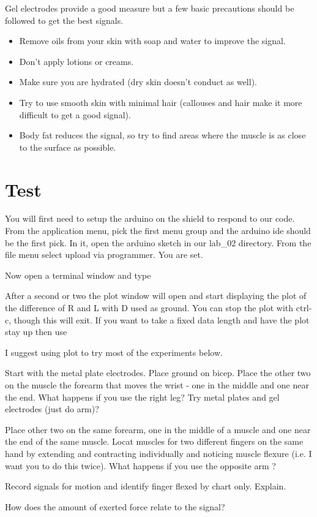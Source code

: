 Gel electrodes provide a good measure but a few basic precautions should be followed to get the best signals.

\begin{itemize}
  \item Remove oils from your skin with soap and water to improve the signal.
  \item Don't apply lotions or creams.
  \item Make sure you are hydrated (dry skin doesn't conduct as well).
  \item Try to use smooth skin with minimal hair (callouses and hair make it more difficult to get a good signal).
  \item Body fat reduces the signal, so try to find areas where the muscle is as close to the surface as possible.
\end{itemize} 



\section{Test}

You will first need to setup the arduino on the shield to respond to our code.  From the application menu, pick the first menu group and the arduino ide should be the first pick.  In it, open the arduino sketch in our lab\_02 directory.  From the file menu select upload via programmer.  You are set.

Now open a terminal window and type



After a second or two the plot window will open and start displaying the plot of the difference of R and L with D used as ground.  You can stop the plot with ctrl-c, though this will exit.  If you want to take a fixed data length and have the plot stay up then use


I suggest using plot to try most of the experiments below.

Start with the metal plate electrodes.  Place ground on bicep.  Place the other two on the muscle the forearm that moves the wrist - one in the middle and one near the end.  What happens if you use the right leg?  Try metal plates and gel electrodes (just do arm)?

Place other two on the same forearm, one in the middle of a muscle and one near the end of the same muscle.  Locat muscles for two different fingers on the same hand by extending and contracting individually and noticing muscle flexure (i.e. I want you to do this twice).  What happens if you use the opposite arm  ?

Record signals for motion and identify finger flexed by chart only.  Explain.

How does the amount of exerted force relate to the signal?